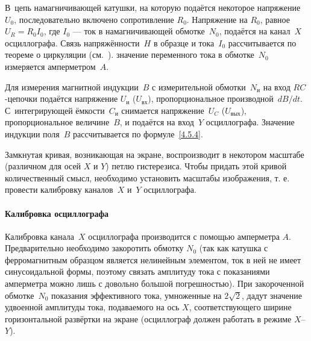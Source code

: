 В~цепь намагничивающей катушки, на которую подаётся некоторое напряжение
$U_0$, последовательно включено сопротивление $R_0$.
Напряжение на $R_0$, равное $U_R=R_0I_0$, где $I_0$ --- ток в
намагничивающей обмотке~$N_0$, подаётся на канал~$X$ осциллографа.
Связь напряжённости~$H$ в образце и тока~$I_0$ рассчитывается по теореме
о циркуляции (см.~).
 значение переменного тока в обмотке~$N_0$ 
измеряется амперметром~$A$.

Для измерения магнитной индукции~$B$ с измерительной обмотки~$N_{и}$ на
вход $RC$-цепочки подаётся напряжение $U_{и}$ ($U_{вх}$),
пропорциональное производной~$dB/dt$.
С~интегрирующей ёмкости~$C_{и}$ снимается напряжение~$U_C$ ($U_{вых}$),
пропорциональное величине~$B$, и подаётся на вход~$Y$ осциллографа.
Значение индукции поля~$B$ рассчитывается по формуле~\eqref{4.5.4}.


Замкнутая кривая, возникающая на экране, воспроизводит в некотором масштабе
(различном для осей $X$ и $Y$) петлю гистерезиса. Чтобы придать этой кривой
количественный смысл, необходимо установить масштабы изображения, т. е. провести
калибровку каналов~$X$ и~$Y$ осциллографа.
%





\paragraph{Калибровка осциллографа}
Калибровка канала~$X$ осциллографа производится с помощью амперметра $A$.
Предварительно необходимо закоротить обмотку $N_0$
(так как катушка с ферромагнитным образцом является
нелинейным элементом, ток в ней не имеет синусоидальной формы,
поэтому связать амплитуду тока с показаниями амперметра можно лишь
с довольно большой погрешностью). При закороченной обмотке~$N_0$
показания эффективного тока, умноженные на $2\sqrt{2}$,
дадут значение удвоенной амплитуды тока, подаваемого на ось $X$,
соответствующего ширине горизонтальной развёртки на экране
(осциллограф должен работать в режиме $X$--$Y$).

